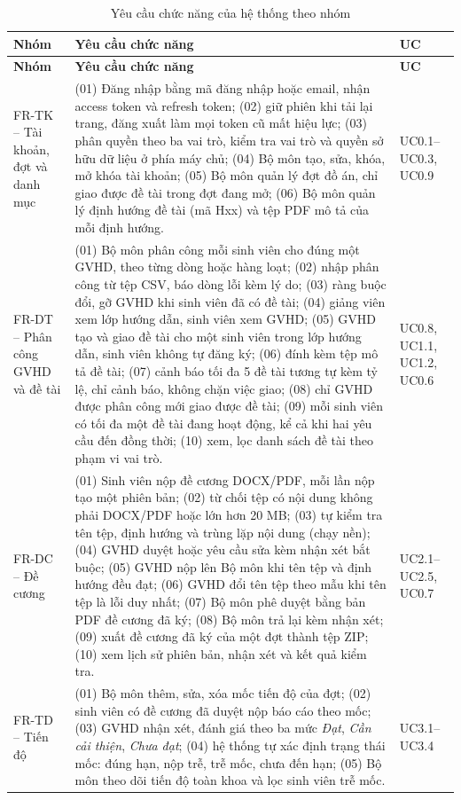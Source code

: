 \documentclass[../main.tex]{subfiles}
\begin{document}
{\renewcommand{\arraystretch}{1.2}
\begin{longtable}{|>{\raggedright\arraybackslash}p{2.4cm}|p{10.4cm}|>{\raggedright\arraybackslash}p{1.9cm}|}
\caption{Yêu cầu chức năng của hệ thống theo nhóm}\label{tab:c2-fr}\\
\hline
\textbf{Nhóm} & \textbf{Yêu cầu chức năng} & \textbf{UC} \\
\hline
\endfirsthead
\hline
\textbf{Nhóm} & \textbf{Yêu cầu chức năng} & \textbf{UC} \\
\hline
\endhead
FR-TK -- Tài khoản, đợt và danh mục & (01) Đăng nhập bằng mã đăng nhập hoặc email, nhận access token và refresh token; (02) giữ phiên khi tải lại trang, đăng xuất làm mọi token cũ mất hiệu lực; (03) phân quyền theo ba vai trò, kiểm tra vai trò và quyền sở hữu dữ liệu ở phía máy chủ; (04) Bộ môn tạo, sửa, khóa, mở khóa tài khoản; (05) Bộ môn quản lý đợt đồ án, chỉ giao được đề tài trong đợt đang mở; (06) Bộ môn quản lý định hướng đề tài (mã Hxx) và tệp PDF mô tả của mỗi định hướng. & UC0.1--UC0.3, UC0.9 \\
\hline
FR-DT -- Phân công GVHD và đề tài & (01) Bộ môn phân công mỗi sinh viên cho đúng một GVHD, theo từng dòng hoặc hàng loạt; (02) nhập phân công từ tệp CSV, báo dòng lỗi kèm lý do; (03) ràng buộc đổi, gỡ GVHD khi sinh viên đã có đề tài; (04) giảng viên xem lớp hướng dẫn, sinh viên xem GVHD; (05) GVHD tạo và giao đề tài cho một sinh viên trong lớp hướng dẫn, sinh viên không tự đăng ký; (06) đính kèm tệp mô tả đề tài; (07) cảnh báo tối đa 5 đề tài tương tự kèm tỷ lệ, chỉ cảnh báo, không chặn việc giao; (08) chỉ GVHD được phân công mới giao được đề tài; (09) mỗi sinh viên có tối đa một đề tài đang hoạt động, kể cả khi hai yêu cầu đến đồng thời; (10) xem, lọc danh sách đề tài theo phạm vi vai trò. & UC0.8, UC1.1, UC1.2, UC0.6 \\
\hline
FR-DC -- Đề cương & (01) Sinh viên nộp đề cương DOCX/PDF, mỗi lần nộp tạo một phiên bản; (02) từ chối tệp có nội dung không phải DOCX/PDF hoặc lớn hơn 20 MB; (03) tự kiểm tra tên tệp, định hướng và trùng lặp nội dung (chạy nền); (04) GVHD duyệt hoặc yêu cầu sửa kèm nhận xét bắt buộc; (05) GVHD nộp lên Bộ môn khi tên tệp và định hướng đều đạt; (06) GVHD đổi tên tệp theo mẫu khi tên tệp là lỗi duy nhất; (07) Bộ môn phê duyệt bằng bản PDF đề cương đã ký; (08) Bộ môn trả lại kèm nhận xét; (09) xuất đề cương đã ký của một đợt thành tệp ZIP; (10) xem lịch sử phiên bản, nhận xét và kết quả kiểm tra. & UC2.1--UC2.5, UC0.7 \\
\hline
FR-TD -- Tiến độ & (01) Bộ môn thêm, sửa, xóa mốc tiến độ của đợt; (02) sinh viên có đề cương đã duyệt nộp báo cáo theo mốc; (03) GVHD nhận xét, đánh giá theo ba mức \textit{Đạt}, \textit{Cần cải thiện}, \textit{Chưa đạt}; (04) hệ thống tự xác định trạng thái mốc: đúng hạn, nộp trễ, trễ mốc, chưa đến hạn; (05) Bộ môn theo dõi tiến độ toàn khoa và lọc sinh viên trễ mốc. & UC3.1--UC3.4 \\

\end{longtable}}
\end{document}
